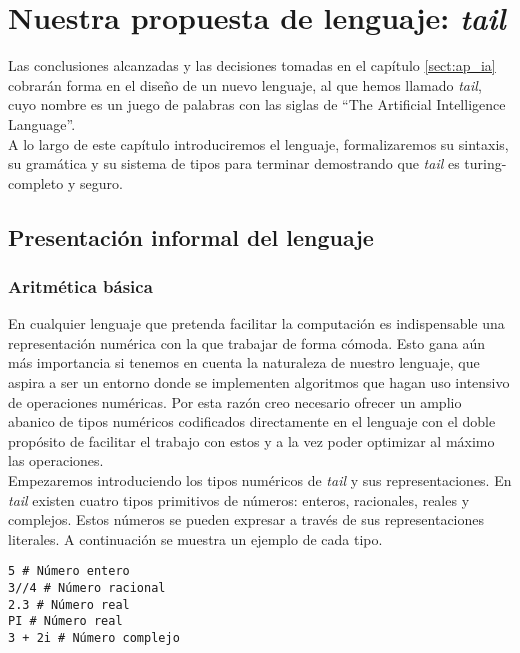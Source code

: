 \chapter{Nuestra propuesta de lenguaje: \textit{tail}}
\label{sect:form_tail}

Las conclusiones alcanzadas y las decisiones tomadas en el capítulo \ref{sect:ap_ia} cobrarán forma en el diseño de un nuevo lenguaje, al que hemos llamado \textit{tail}, cuyo nombre es un juego de palabras con las siglas de ``The Artificial Intelligence Language''.\\

A lo largo de este capítulo introduciremos el lenguaje, formalizaremos su sintaxis, su gramática y su sistema de tipos para terminar demostrando que \textit{tail} es turing-completo y seguro.

\section{Presentación informal del lenguaje}

\subsection{Aritmética básica}

En cualquier lenguaje que pretenda facilitar la computación es indispensable una representación numérica con la que trabajar de forma cómoda. Esto gana aún más importancia si tenemos en cuenta la naturaleza de nuestro lenguaje, que aspira a ser un entorno donde se implementen algoritmos que hagan uso intensivo de operaciones numéricas. Por esta razón creo necesario ofrecer un amplio abanico de tipos numéricos codificados directamente en el lenguaje con el doble propósito de facilitar el trabajo con estos y a la vez poder optimizar al máximo las operaciones.\\

Empezaremos introduciendo los tipos numéricos de \textit{tail} y sus representaciones. En \textit{tail} existen cuatro tipos primitivos de números: enteros, racionales, reales y complejos. Estos números se pueden expresar a través de sus representaciones literales. A continuación se muestra un ejemplo de cada tipo.

\begin{lstlisting}[style=tail, caption={Ejemplo de expresiones numéricas literales}]
5 # Número entero
3//4 # Número racional
2.3 # Número real
PI # Número real
3 + 2i # Número complejo
\end{lstlisting}

